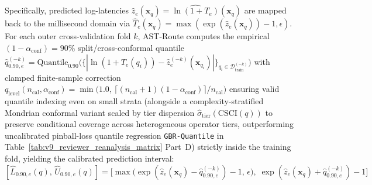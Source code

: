\documentclass[10pt,a4paper]{article}
\begin{document}
Specifically, predicted log-latencies $\hat{z}_e(\mathbf{x}_q) = \widehat{\ln(1+T_e)}(\mathbf{x}_q)$ are mapped back to the millisecond domain via $\hat{T}_e(\mathbf{x}_q) = \max(\exp(\hat{z}_e(\mathbf{x}_q)) - 1, \epsilon)$. For each outer cross-validation fold $k$, AST-Route computes the empirical $(1-\alpha_{\text{conf}})=90\%$ split/cross-conformal quantile $\hat{q}_{0.90,e}^{(-k)} = \text{Quantile}_{0.90}\big(\{|\ln(1+T_e(q_i)) - \hat{z}_e^{(-k)}(\mathbf{x}_{q_i})|\}_{q_i \in \mathcal{D}_{\text{train}}^{(-k)}}\big)$ with clamped finite-sample correction $q_{\text{level}}(n_{\text{cal}},\alpha_{\text{conf}}) = \min\!\big(1.0,\, \lceil(n_{\text{cal}}+1)(1-\alpha_{\text{conf}})\rceil/n_{\text{cal}}\big)$ ensuring valid quantile indexing even on small strata (alongside a complexity-stratified Mondrian conformal variant scaled by tier dispersion $\hat{\sigma}_{\text{tier}}(\text{CSCI}(q))$ to preserve conditional coverage across heterogeneous operator tiers, outperforming uncalibrated pinball-loss quantile regression \texttt{GBR-Quantile} in Table~\ref{tab:v9_reviewer_reanalysis_matrix} Part~D) strictly inside the training fold, yielding the calibrated prediction interval:
\begin{equation}\label{eq:conformal_interval}
[\hat{L}_{0.90,e}(q),\, \hat{U}_{0.90,e}(q)] = \Big[\max\!\big(\exp(\hat{z}_e(\mathbf{x}_q) - \hat{q}_{0.90,e}^{(-k)}) - 1,\, \epsilon\big),\; \exp(\hat{z}_e(\mathbf{x}_q) + \hat{q}_{0.90,e}^{(-k)}) - 1\Big]
\end{equation}
\end{document}

